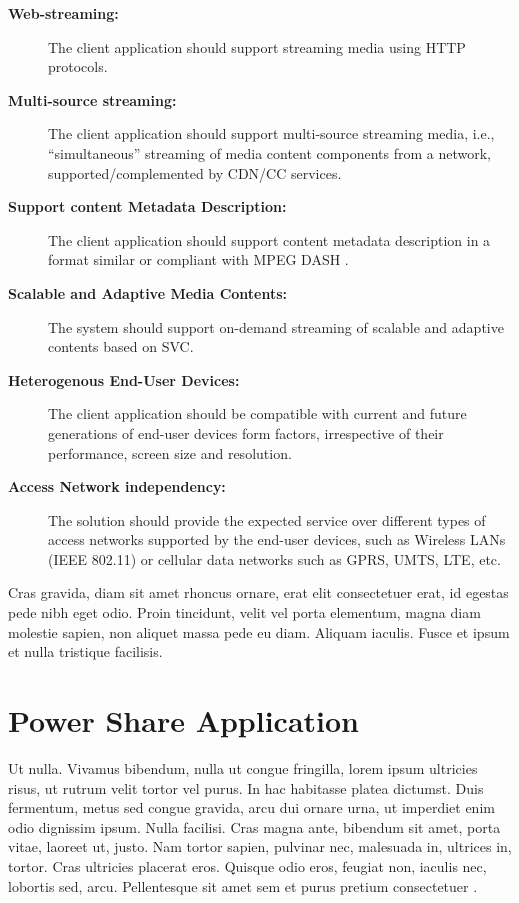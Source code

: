 \begin{description}
	\item[\textbf{Web-streaming:}]
	The client application should support streaming media using \ac{HTTP} protocols.
	\item[\textbf{Multi-source streaming:}]
	The client application should support multi-source streaming media, i.e., ``simultaneous'' streaming of media content components from a network, supported\slash complemented by \ac{CDN}\slash \ac{CC} services. 
	\item[\textbf{Support content Metadata Description:}]
	The client application should support content metadata description in a format similar or compliant with MPEG \ac{DASH} \cite{ISO/IEC:2012fk}. 
	\item[\textbf{Scalable and Adaptive Media Contents:}]
	The system should support on-demand streaming of scalable and adaptive contents based on \ac{SVC}.
	\item[\textbf{Heterogenous End-User Devices:}]
	The client application should be compatible with current and future generations of end-user devices form factors, irrespective of their performance, screen size and resolution.
	\item[\textbf{Access Network independency:}] 
	The solution should provide the expected service over different types of access networks supported by the end-user devices, such as Wireless \acp{LAN} (IEEE 802.11) or cellular data networks such as \ac{GPRS}, \ac{UMTS}, \ac{LTE}, etc.
\end{description}

Cras gravida, diam sit amet rhoncus ornare, erat elit consectetuer erat, id egestas pede nibh eget odio. Proin tincidunt, velit vel porta elementum, magna diam molestie sapien, non aliquet massa pede eu diam. Aliquam iaculis. Fusce et ipsum et nulla tristique facilisis.
\section{Power Share Application}
Ut nulla. Vivamus bibendum, nulla ut congue fringilla, lorem ipsum ultricies risus, ut rutrum velit tortor vel purus. In hac habitasse platea dictumst. Duis fermentum, metus sed congue gravida, arcu dui ornare urna, ut imperdiet enim odio dignissim ipsum. Nulla facilisi. Cras magna ante, bibendum sit amet, porta vitae, laoreet ut, justo. Nam tortor sapien, pulvinar nec, malesuada in, ultrices in, tortor. Cras ultricies placerat eros. Quisque odio eros, feugiat non, iaculis nec, lobortis sed, arcu. Pellentesque sit amet sem et purus pretium consectetuer .

